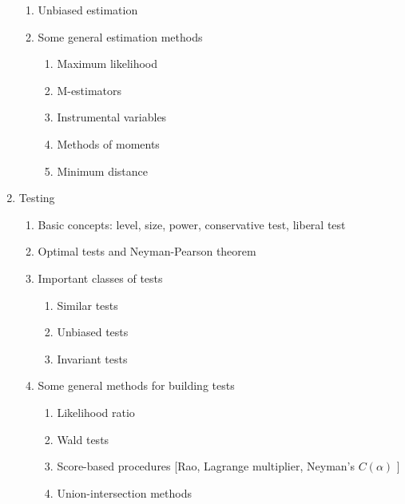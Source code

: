 \documentclass[titlepage,11pt,amstex]{article}
\begin{document}
\begin{enumerate}
\begin{enumerate}
\item Unbiased estimation

\item Some general estimation methods

\begin{enumerate}
\item Maximum likelihood

\item M-estimators

\item Instrumental variables

\item Methods of moments

\item Minimum distance
\end{enumerate}
\end{enumerate}

\item Testing

\begin{enumerate}
\item Basic concepts: level, size, power, conservative test, liberal test

\item Optimal tests and Neyman-Pearson theorem

\item Important classes of tests

\begin{enumerate}
\item Similar tests

\item Unbiased tests

\item Invariant tests
\end{enumerate}

\item Some general methods for building tests

\begin{enumerate}
\item Likelihood ratio

\item Wald tests

\item Score-based procedures [Rao, Lagrange multiplier, Neyman's $C(\alpha )$%
]

\item Union-intersection methods
\end{enumerate}
\end{enumerate}


\end{enumerate}
\end{document}
